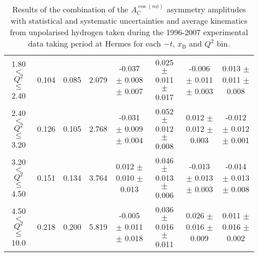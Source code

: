 \begin{table}[width=15cm]
\begin{center}
{\begin{tabular}{|c|c|c|c|c|c|c|c|}
1.80 $<$ $Q^{2}$ $\leqslant$ 2.40 &  0.104 & 0.085 &  2.079 &  -0.037  $\pm$  0.008  $\pm$   0.007 &
 0.025  $\pm$  0.011  $\pm$   0.017 & -0.006 $\pm$   0.011  $\pm$  0.003 & 0.013  $\pm$   0.011  $\pm$  0.008\\
2.40 $<$ $Q^{2}$ $\leqslant$ 3.20 &  0.126 & 0.105  & 2.768 &  -0.031 $\pm$   0.009  $\pm$   0.004 &  
0.052  $\pm$  0.012  $\pm$   0.008 & 0.012  $\pm$  0.012  $\pm$  0.003 & -0.012  $\pm$  0.012  $\pm$  0.001\\
3.20 $<$ $Q^{2}$ $\leqslant$ 4.50 &  0.151 & 0.134 &  3.764 &  0.012  $\pm$  0.010   $\pm$  0.013 & 
0.046 $\pm$   0.013  $\pm$   0.006 & -0.013  $\pm$  0.013 $\pm$ 0.003 & -0.014   $\pm$  0.013  $\pm$  0.008\\
4.50 $<$ $Q^{2}$ $\leqslant$ 10.0 &  0.218 & 0.200 &  5.819 &  -0.005  $\pm$  0.011  $\pm$   0.018 & 
0.036  $\pm$  0.016  $\pm$  0.011 & 0.026 $\pm$   0.016  $\pm$  0.009 & 0.011   $\pm$  0.016   $\pm$   0.002\\
\hline
  \end{tabular}
}
 \end{center}
\caption{Results of the combination of the $A_{\textrm{C}}^{\cos(n\phi)}$ asymmetry amplitudes with statistical and systematic uncertainties and average kinematics from unpolarised hydrogen taken during
the 1996-2007 experimental data taking period at H{\sc ermes} for each $-t$, $x_{\textrm{B}}$ and $Q^{2}$ bin.}
\end{table}

